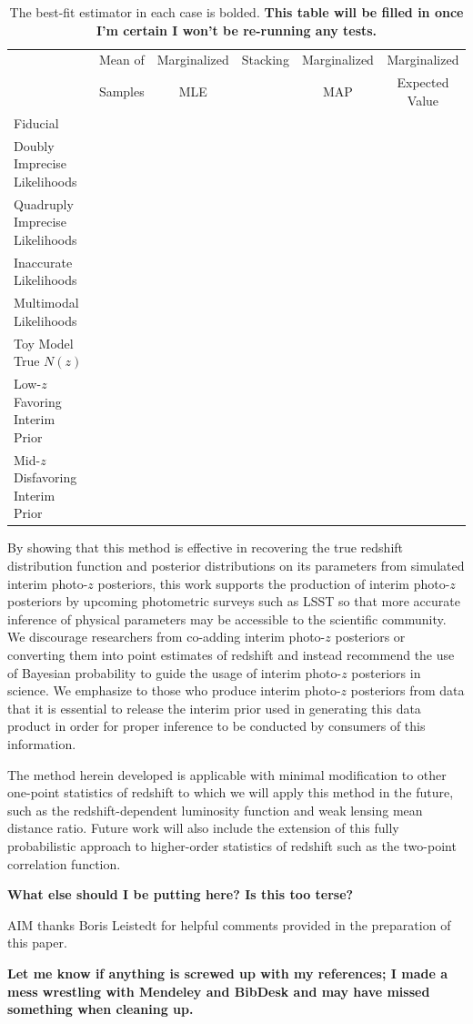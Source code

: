 \documentclass[preprint]{aastex}
\begin{document}
\begin{table}
\begin{tabular}{lccccc}
& Mean of & Marginalized & Stacking & Marginalized & Marginalized\\
& Samples & MLE & & MAP & Expected Value\\
Fiducial &&&&&\\
Doubly Imprecise Likelihoods &&&&&\\
Quadruply Imprecise Likelihoods &&&&&\\
Inaccurate Likelihoods &&&&&\\
Multimodal Likelihoods &&&&&\\
Toy Model True $N(z)$ &&&&&\\
Low-$z$ Favoring Interim Prior &&&&&\\
Mid-$z$ Disfavoring Interim Prior &&&&&
\end{tabular}
\caption{The best-fit estimator in each case is bolded.  \textbf{This table 
will be filled in once I'm certain I won't be re-running any tests.}}
\label{tab:kld}
\end{table}

By showing that this method is effective in recovering the true redshift 
distribution function and posterior distributions on its parameters from 
simulated interim photo-$z$ posteriors, this work supports the production of 
interim photo-$z$ posteriors by upcoming photometric surveys such as LSST so 
that more accurate inference of physical parameters may be accessible to the 
scientific community.  We discourage researchers from co-adding interim 
photo-$z$ posteriors or converting them into point estimates of redshift and 
instead recommend the use of Bayesian probability to guide the usage of interim 
photo-$z$ posteriors in science.  We emphasize to those who produce interim 
photo-$z$ posteriors from data that it is essential to release the interim 
prior used in generating this data product in order for proper inference to be 
conducted by consumers of this information.

The method herein developed is applicable with minimal modification to other 
one-point statistics of redshift to which we will apply this method in the 
future, such as the redshift-dependent luminosity function and weak lensing 
mean distance ratio.  Future work will also include the extension of this fully 
probabilistic approach to higher-order statistics of redshift such as the 
two-point correlation function.

\textbf{What else should I be putting here?  Is this too terse?}

\clearpage

\begin{acknowledgements}
AIM thanks Boris Leistedt for helpful comments provided in the preparation of 
this paper.
\end{acknowledgements}

\textbf{Let me know if anything is screwed up with my references; I made a mess 
wrestling with Mendeley and BibDesk and may have missed something when cleaning 
up.}


\end{document}
